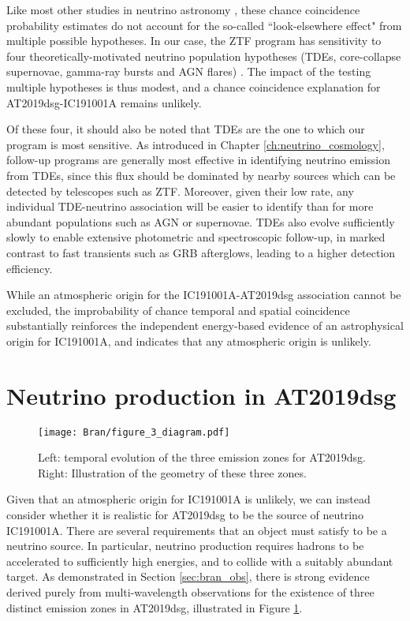 Like most other studies in neutrino astronomy , these chance coincidence probability estimates do not account for the so-called ``look-elsewhere effect" from multiple possible hypotheses. In our case, the ZTF program has sensitivity to four theoretically-motivated neutrino population hypotheses (TDEs, core-collapse supernovae, gamma-ray bursts and AGN flares) . The impact of the testing multiple hypotheses is thus modest, and a chance coincidence explanation for AT2019dsg-IC191001A remains unlikely.

Of these four, it should also be noted that TDEs are the one to which our program is most sensitive. As introduced in Chapter \ref{ch:neutrino_cosmology}, follow-up programs are generally most effective in identifying neutrino emission from TDEs, since this flux should be dominated by nearby sources which can be detected by telescopes such as ZTF. Moreover, given their low rate, any individual TDE-neutrino association will be easier to identify than for more abundant populations such as AGN or supernovae. TDEs also evolve sufficiently slowly to enable extensive photometric and spectroscopic follow-up, in marked contrast to fast transients such as GRB afterglows, leading to a higher detection efficiency.

While an atmospheric origin  for the IC191001A-AT2019dsg association cannot be excluded, the improbability of chance temporal and spatial coincidence substantially reinforces the independent energy-based evidence of an astrophysical origin for IC191001A, and indicates that any atmospheric origin is unlikely.

\section{Neutrino production in AT2019dsg} 

\begin{figure}[!ht]
	\texttt{[image: Bran/figure\_3\_diagram.pdf]}
	\caption{Left: temporal evolution of the three emission zones for AT2019dsg. Right: Illustration of the geometry of these three zones.}
	\label{fig:bran_diagram}
\end{figure}

Given that an atmospheric origin for IC191001A is unlikely, we can instead consider whether it is realistic for AT2019dsg to be the source of neutrino IC191001A. There are several requirements that an object must satisfy to be a neutrino source. In particular, neutrino production requires hadrons to be accelerated to sufficiently high energies, and to collide with a suitably abundant target. As demonstrated in Section \ref{sec:bran_obs}, there is strong evidence derived purely from multi-wavelength observations for the existence of three distinct emission zones in AT2019dsg, illustrated in Figure \ref{fig:bran_diagram}. 

